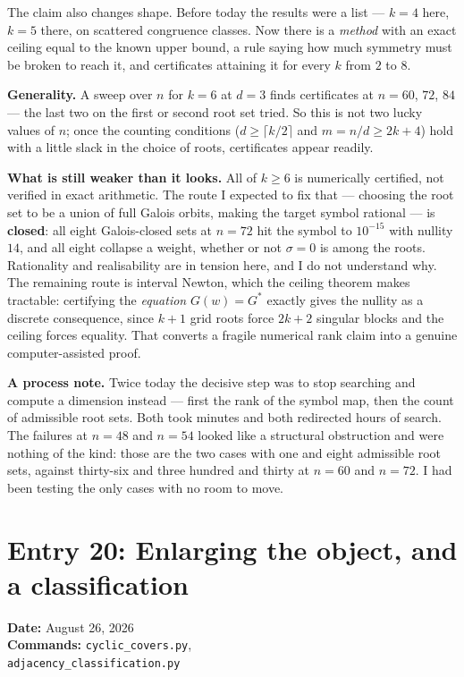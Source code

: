 \documentclass[12pt]{article}
\begin{document}
The claim also changes shape. Before today the results were a list ---
$k=4$ here, $k=5$ there, on scattered congruence classes. Now there is a
\emph{method} with an exact ceiling equal to the known upper bound, a rule
saying how much symmetry must be broken to reach it, and certificates
attaining it for every $k$ from $2$ to $8$.

\textbf{Generality.} A sweep over $n$ for $k=6$ at $d=3$ finds certificates at
$n=60$, $72$, $84$ --- the last two on the first or second root set tried. So
this is not two lucky values of $n$; once the counting conditions
($d\ge\lceil k/2\rceil$ and $m=n/d\ge2k+4$) hold with a little slack in the
choice of roots, certificates appear readily.

\textbf{What is still weaker than it looks.} All of $k\ge6$ is numerically
certified, not verified in exact arithmetic. The route I expected to fix that
--- choosing the root set to be a union of full Galois orbits, making the target
symbol rational --- is \textbf{closed}: all eight Galois-closed sets at $n=72$
hit the symbol to $10^{-15}$ with nullity $14$, and all eight collapse a
weight, whether or not $\sigma=0$ is among the roots. Rationality and
realisability are in tension here, and I do not understand why. The remaining
route is interval Newton, which the ceiling theorem makes tractable: certifying
the \emph{equation} $G(w)=G^\ast$ exactly gives the nullity as a discrete
consequence, since $k+1$ grid roots force $2k+2$ singular blocks and the
ceiling forces equality. That converts a fragile numerical rank claim into a
genuine computer-assisted proof.

\textbf{A process note.} Twice today the decisive step was to stop searching
and compute a dimension instead --- first the rank of the symbol map, then the
count of admissible root sets. Both took minutes and both redirected hours of
search. The failures at $n=48$ and $n=54$ looked like a structural obstruction
and were nothing of the kind: those are the two cases with one and eight
admissible root sets, against thirty-six and three hundred and thirty at
$n=60$ and $n=72$. I had been testing the only cases with no room to move.


\clearpage
\section*{Entry 20: Enlarging the object, and a classification}
\textbf{Date:} August 26, 2026\\
\textbf{Commands:} {\small\texttt{cyclic\_covers.py},}\\
{\small\texttt{adjacency\_classification.py}}
\end{document}
